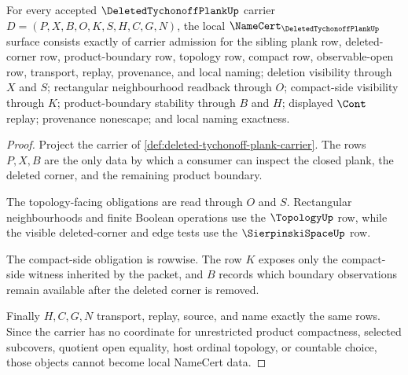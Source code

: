 \begin{theorem}
\label{thm:deleted-tychonoff-plank-namecert-obligations}
For every accepted $\DeletedTychonoffPlankUp$ carrier $D=(P,X,B,O,K,S,H,C,G,N)$, the local $\NameCert_{\DeletedTychonoffPlankUp}$ surface consists exactly of carrier admission for the sibling plank row, deleted-corner row, product-boundary row, topology row, compact row, observable-open row, transport, replay, provenance, and local naming; deletion visibility through $X$ and $S$; rectangular neighbourhood readback through $O$; compact-side visibility through $K$; product-boundary stability through $B$ and $H$; displayed $\Cont$ replay; provenance nonescape; and local naming exactness.
\end{theorem}
\begin{proof}
Project the carrier of \autoref{def:deleted-tychonoff-plank-carrier}. The rows $P,X,B$ are the only data by which a consumer can inspect the closed plank, the deleted corner, and the remaining product boundary.

The topology-facing obligations are read through $O$ and $S$. Rectangular neighbourhoods and finite Boolean operations use the $\TopologyUp$ row, while the visible deleted-corner and edge tests use the $\SierpinskiSpaceUp$ row.

The compact-side obligation is rowwise. The row $K$ exposes only the compact-side witness inherited by the packet, and $B$ records which boundary observations remain available after the deleted corner is removed.

Finally $H,C,G,N$ transport, replay, source, and name exactly the same rows. Since the carrier has no coordinate for unrestricted product compactness, selected subcovers, quotient open equality, host ordinal topology, or countable choice, those objects cannot become local NameCert data.
\end{proof}

